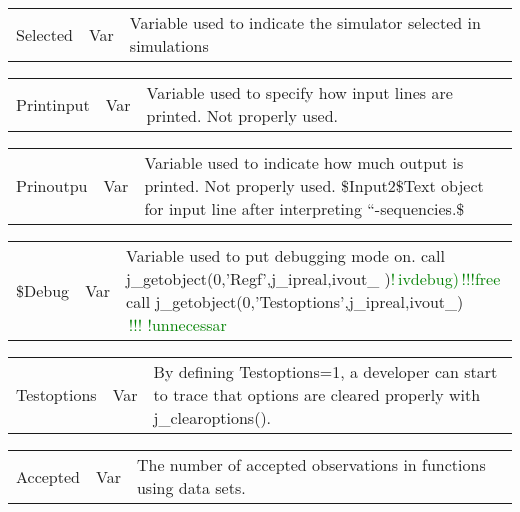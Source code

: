 \vspace{-1.51em}
\begin{table}[H]
 \begin{tabular}{ m{}  m{} p{}}
Selected& Var &Variable used to indicate the simulator selected in simulations
\end{tabular}
\end{table}
\vspace{-1.51em}
\begin{table}[H]
 \begin{tabular}{ m{}  m{} p{}}
Printinput& Var& Variable used to specify how input lines are printed. Not properly used.
\end{tabular}
\end{table}
\vspace{-1.51em}
\begin{table}[H]
 \begin{tabular}{ m{}  m{} p{}}
Prinoutpu& Var& Variable used to indicate how much output is printed. Not properly used.
 \$Input2\$Text object for input line after interpreting “-sequencies.\$
\end{tabular}
\end{table}
\vspace{-1.51em}
\begin{table}[H]
 \begin{tabular}{ m{}  m{} p{}}
 \$Debug&Var& Variable used to put debugging mode on.
call j\_getobject(0,'Regf',j\_ipreal,ivout\_ )\textcolor{green}{!\,ivdebug)\,!!!free}
call j\_getobject(0,'Testoptions',j\_ipreal,ivout\_) \,\textcolor{green}{!!!\,\,!unnecessar}
\end{tabular}
\end{table}
\vspace{-1.51em}
\begin{table}[H]
 \begin{tabular}{ m{}  m{} p{}}
Testoptions&Var& By defining Testoptions=1, a developer can start to trace that
 options are cleared properly with j\_clearoptions().
\end{tabular}
\end{table}
\vspace{-1.51em}
\begin{table}[H]
 \begin{tabular}{ m{}  m{} p{}}
 Accepted &Var& The number of accepted observations in functions using data sets.
\end{tabular}
\end{table}
